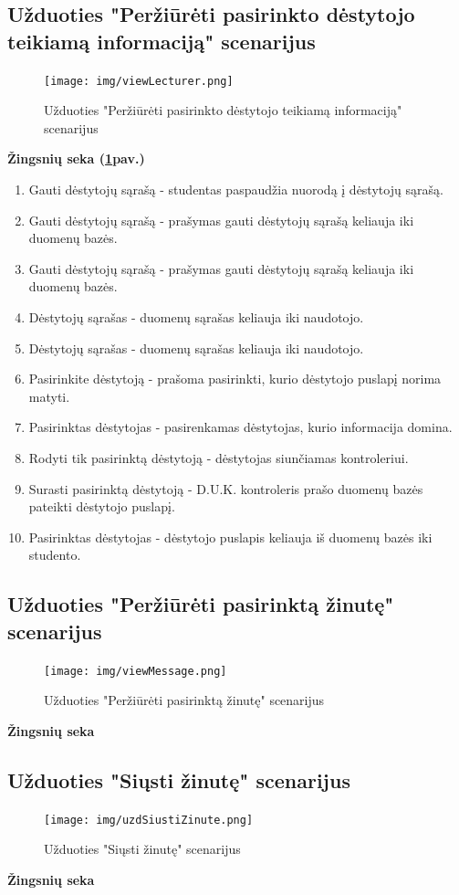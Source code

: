 \documentclass{VUMIFPSkursinis}
\begin{document}
\subsection{Užduoties "Peržiūrėti pasirinkto dėstytojo teikiamą informaciją" scenarijus}
\begin{figure}[H]
	\centering
	\texttt{[image: img/viewLecturer.png]}
	\caption{Užduoties "Peržiūrėti pasirinkto dėstytojo teikiamą informaciją" scenarijus}
	\label{fig:viewLec}
\end{figure}
\textbf{Žingsnių seka (\ref{fig:viewLec}pav.)}\\
\begin{enumerate}
	\item Gauti dėstytojų sąrašą - studentas paspaudžia nuorodą į dėstytojų sąrašą.
	\item Gauti dėstytojų sąrašą - prašymas gauti dėstytojų sąrašą keliauja iki duomenų bazės.
	\item Gauti dėstytojų sąrašą - prašymas gauti dėstytojų sąrašą keliauja iki duomenų bazės.
	\item Dėstytojų sąrašas - duomenų sąrašas keliauja iki naudotojo.
	\item Dėstytojų sąrašas -  duomenų sąrašas keliauja iki naudotojo.
	\item Pasirinkite dėstytoją - prašoma pasirinkti, kurio dėstytojo puslapį norima matyti.
	\item Pasirinktas dėstytojas - pasirenkamas dėstytojas, kurio informacija domina.
	\item Rodyti tik pasirinktą dėstytoją - dėstytojas siunčiamas kontroleriui.
	\item Surasti pasirinktą dėstytoją -  D.U.K. kontroleris prašo duomenų bazės pateikti dėstytojo puslapį.
	\item Pasirinktas dėstytojas - dėstytojo puslapis keliauja iš duomenų bazės iki studento.
\end{enumerate}
\subsection{Užduoties "Peržiūrėti pasirinktą žinutę" scenarijus}
\begin{figure}[H]
	\centering
	\texttt{[image: img/viewMessage.png]}
	\caption{Užduoties "Peržiūrėti pasirinktą žinutę" scenarijus}
	\label{fig:viewMess}
\end{figure}
\textbf{Žingsnių seka}\\
\subsection{Užduoties "Siųsti žinutę" scenarijus}
\begin{figure}[H]
	\centering
	\texttt{[image: img/uzdSiustiZinute.png]}
	\caption{Užduoties "Siųsti žinutę" scenarijus}
	\label{fig:sendMess}
\end{figure}
\textbf{Žingsnių seka}\\
\end{document}
